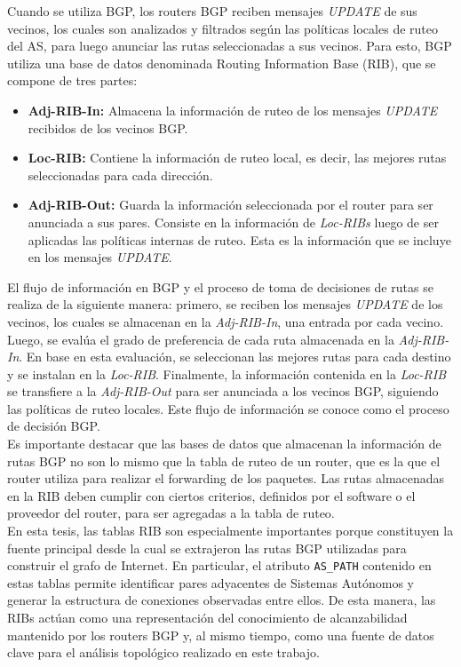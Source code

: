 Cuando se utiliza BGP, los routers BGP reciben mensajes \textit{UPDATE} de sus vecinos, los cuales son analizados y filtrados según las políticas locales de ruteo del AS, para luego anunciar las rutas seleccionadas a sus vecinos. Para esto, BGP utiliza una base de datos denominada Routing Information Base (RIB), que se compone de tres partes:\\

\begin{itemize}
    \item \textbf{Adj-RIB-In:} Almacena la información de ruteo de los mensajes \textit{UPDATE} recibidos de los vecinos BGP.
    \item \textbf{Loc-RIB:} Contiene la información de ruteo local, es decir, las mejores rutas seleccionadas para cada dirección.
    \item \textbf{Adj-RIB-Out:} Guarda la información seleccionada por el router para ser anunciada a sus pares. Consiste en la información de \textit{Loc-RIBs} luego de ser aplicadas las políticas internas de ruteo. Esta es la información que se incluye en los mensajes \textit{UPDATE}.
\end{itemize}

El flujo de información en BGP y el proceso de toma de decisiones de rutas se realiza de la siguiente manera:
primero, se reciben los mensajes \textit{UPDATE} de los vecinos, los cuales se almacenan en la \textit{Adj-RIB-In}, una entrada por cada vecino. Luego, se evalúa el grado de preferencia de cada ruta almacenada en la \textit{Adj-RIB-In}. En base en esta evaluación, se seleccionan las mejores rutas para cada destino y se instalan en la \textit{Loc-RIB}. Finalmente, la información contenida en la \textit{Loc-RIB} se transfiere a la \textit{Adj-RIB-Out} para ser anunciada a los vecinos BGP, siguiendo las políticas de ruteo locales. Este flujo de información se conoce como el proceso de decisión BGP.\\

Es importante destacar que las bases de datos que almacenan la información de rutas BGP no son lo mismo que la tabla de ruteo de un router, que es la que el router utiliza para realizar el forwarding de los paquetes. Las rutas almacenadas en la RIB deben cumplir con ciertos criterios, definidos por el software o el proveedor del router, para ser agregadas a la tabla de ruteo.\\

En esta tesis, las tablas RIB son especialmente importantes porque constituyen la fuente principal desde la cual se extrajeron las rutas BGP utilizadas para construir el grafo de Internet. En particular, el atributo \texttt{AS\_PATH} contenido en estas tablas permite identificar pares adyacentes de Sistemas Autónomos y generar la estructura de conexiones observadas entre ellos. De esta manera, las RIBs actúan como una representación del conocimiento de alcanzabilidad mantenido por los routers BGP y, al mismo tiempo, como una fuente de datos clave para el análisis topológico realizado en este trabajo.\\
